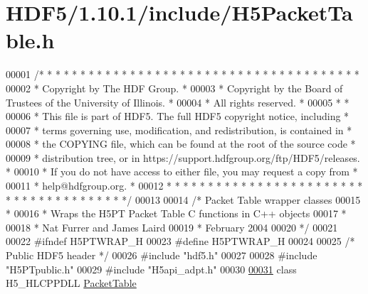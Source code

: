 \hypertarget{_h_d_f5_21_810_81_2include_2_h5_packet_table_8h_source}{}\section{H\+D\+F5/1.10.1/include/\+H5\+Packet\+Table.h}
\label{_h_d_f5_21_810_81_2include_2_h5_packet_table_8h_source}

\begin{DoxyCode}
00001 \textcolor{comment}{/* * * * * * * * * * * * * * * * * * * * * * * * * * * * * * * * * * * * * * *}
00002 \textcolor{comment}{ * Copyright by The HDF Group.                                               *}
00003 \textcolor{comment}{ * Copyright by the Board of Trustees of the University of Illinois.         *}
00004 \textcolor{comment}{ * All rights reserved.                                                      *}
00005 \textcolor{comment}{ *                                                                           *}
00006 \textcolor{comment}{ * This file is part of HDF5.  The full HDF5 copyright notice, including     *}
00007 \textcolor{comment}{ * terms governing use, modification, and redistribution, is contained in    *}
00008 \textcolor{comment}{ * the COPYING file, which can be found at the root of the source code       *}
00009 \textcolor{comment}{ * distribution tree, or in https://support.hdfgroup.org/ftp/HDF5/releases.  *}
00010 \textcolor{comment}{ * If you do not have access to either file, you may request a copy from     *}
00011 \textcolor{comment}{ * help@hdfgroup.org.                                                        *}
00012 \textcolor{comment}{ * * * * * * * * * * * * * * * * * * * * * * * * * * * * * * * * * * * * * * */}
00013 
00014 \textcolor{comment}{/* Packet Table wrapper classes}
00015 \textcolor{comment}{ *}
00016 \textcolor{comment}{ * Wraps the H5PT Packet Table C functions in C++ objects}
00017 \textcolor{comment}{ *}
00018 \textcolor{comment}{ * Nat Furrer and James Laird}
00019 \textcolor{comment}{ * February 2004}
00020 \textcolor{comment}{ */}
00021 
00022 \textcolor{preprocessor}{#ifndef H5PTWRAP\_H}
00023 \textcolor{preprocessor}{#define H5PTWRAP\_H}
00024 
00025 \textcolor{comment}{/* Public HDF5 header */}
00026 \textcolor{preprocessor}{#include "hdf5.h"}
00027 
00028 \textcolor{preprocessor}{#include "H5PTpublic.h"}
00029 \textcolor{preprocessor}{#include "H5api\_adpt.h"}
00030 
\hyperlink{class_packet_table}{00031} \textcolor{keyword}{class }H5\_HLCPPDLL  \hyperlink{class_packet_table}{PacketTable}

\end{DoxyCode}
